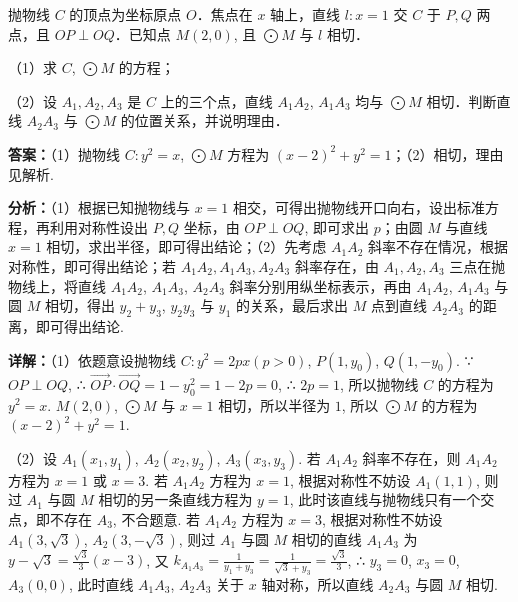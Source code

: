 \begin{question}[points=12]
抛物线 $C$ 的顶点为坐标原点 $O$．焦点在 $x$ 轴上，直线 $l: x=1$ 交 $C$ 于 $P, Q$ 两点，且 $OP \perp OQ$．已知点 $M(2,0)$, 且 $\bigodot M$ 与 $l$ 相切．



（1）求 $C$, $\bigodot M$ 的方程；



（2）设 $A_1, A_2, A_3$ 是 $C$ 上的三个点，直线 $A_1A_2$, $A_1A_3$ 均与 $\bigodot M$ 相切．判断直线 $A_2A_3$ 与 $\bigodot M$ 的位置关系，并说明理由．
\begin{solution}
\textbf{答案：}（1）抛物线 $C: y^2 = x$, $\bigodot M$ 方程为 $(x-2)^2 + y^2 = 1$；（2）相切，理由见解析.

\textbf{分析：}（1）根据已知抛物线与 $x=1$ 相交，可得出抛物线开口向右，设出标准方程，再利用对称性设出 $P, Q$ 坐标，由 $OP \perp OQ$, 即可求出 $p$；由圆 $M$ 与直线 $x=1$ 相切，求出半径，即可得出结论；（2）先考虑 $A_1A_2$ 斜率不存在情况，根据对称性，即可得出结论；若 $A_1A_2, A_1A_3, A_2A_3$ 斜率存在，由 $A_1, A_2, A_3$ 三点在抛物线上，将直线 $A_1A_2$, $A_1A_3$, $A_2A_3$ 斜率分别用纵坐标表示，再由 $A_1A_2$, $A_1A_3$ 与圆 $M$ 相切，得出 $y_2+y_3$, $y_2y_3$ 与 $y_1$ 的关系，最后求出 $M$ 点到直线 $A_2A_3$ 的距离，即可得出结论.

\textbf{详解：}（1）依题意设抛物线 $C: y^2 = 2px (p>0)$, $P(1, y_0)$, $Q(1, -y_0)$. ∵ $OP \perp OQ$, ∴ $\overrightarrow{OP} \cdot \overrightarrow{OQ} = 1 - y_0^2 = 1 - 2p = 0$, ∴ $2p=1$, 所以抛物线 $C$ 的方程为 $y^2 = x$. $M(2,0)$, $\bigodot M$ 与 $x=1$ 相切，所以半径为 $1$, 所以 $\bigodot M$ 的方程为 $(x-2)^2 + y^2 = 1$.

（2）设 $A_1(x_1, y_1)$, $A_2(x_2, y_2)$, $A_3(x_3, y_3)$. 若 $A_1A_2$ 斜率不存在，则 $A_1A_2$ 方程为 $x=1$ 或 $x=3$. 若 $A_1A_2$ 方程为 $x=1$, 根据对称性不妨设 $A_1(1,1)$, 则过 $A_1$ 与圆 $M$ 相切的另一条直线方程为 $y=1$, 此时该直线与抛物线只有一个交点，即不存在 $A_3$, 不合题意. 若 $A_1A_2$ 方程为 $x=3$, 根据对称性不妨设 $A_1(3,\sqrt{3})$, $A_2(3,-\sqrt{3})$, 则过 $A_1$ 与圆 $M$ 相切的直线 $A_1A_3$ 为 $y-\sqrt{3} = \frac{\sqrt{3}}{3}(x-3)$, 又 $k_{A_1A_3} = \frac{1}{y_1+y_3} = \frac{1}{\sqrt{3}+y_3} = \frac{\sqrt{3}}{3}$, ∴ $y_3=0$, $x_3=0$, $A_3(0,0)$, 此时直线 $A_1A_3$, $A_2A_3$ 关于 $x$ 轴对称，所以直线 $A_2A_3$ 与圆 $M$ 相切.


\end{solution}
\end{question}
